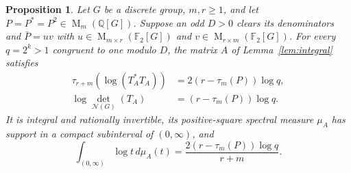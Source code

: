 \documentclass[11pt]{article}
\newtheorem{proposition}[theorem]{Proposition}
\theoremstyle{remark}
\numberwithin{equation}{section}
\newcommand{\F}{\mathbb F}
\newcommand{\Q}{\mathbb Q}
\newcommand{\Mat}{\operatorname{M}}
\newcommand{\N}{\mathcal N}
\begin{document}
\begin{proposition}\label{prop:criterion}
Let $G$ be a discrete group, $m,r\ge1$, and let
$P=P^*=P^2\in\Mat_m(\Q[G])$. Suppose an odd $D>0$ clears its
denominators and $\bar P=uv$ with
$u\in\Mat_{m\times r}(\F_2[G])$ and
$v\in\Mat_{r\times m}(\F_2[G])$. For every $q=2^k>1$ congruent to one
modulo $D$, the matrix $A$ of Lemma~\ref{lem:integral} satisfies
\begin{align}
 \tau_{r+m}(\log(T_A^*T_A))
   &=2(r-\tau_m(P))\log q,\label{eq:criterion-trace}\\
 \log\det_{\N(G)}(T_A)&=(r-\tau_m(P))\log q.
 \label{eq:criterion-det}
\end{align}
It is integral and rationally invertible, its positive-square
spectral measure $\mu_A$ has support in a compact subinterval of $(0,\infty)$, and
\begin{equation}\label{eq:criterion-integral}
 \int_{(0,\infty)}\log t\,d\mu_A(t)
 =\frac{2(r-\tau_m(P))\log q}{r+m}.
\end{equation}
\end{proposition}
\end{document}
